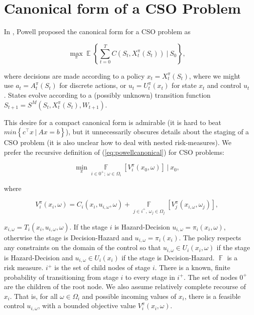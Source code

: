 \documentclass[final,1p,times]{elsarticle}
\DeclareMathOperator*{\E}{\mathbb{E}}
\DeclareMathOperator*{\F}{\mathbb{F}}
\begin{document}
\section{Canonical form of a CSO Problem}\label{sec:canonical}

In \cite{powell_tutORial}, Powell proposed the canonical form for a CSO problem as

\begin{equation}
    \max\limits_\pi \E \left\{\sum\limits_{t=0}^T C(S_t, X_t^\pi(S_t))\ |\ S_0 \right\},
    \label{eq:powellcanonical}
\end{equation}

where decisions are made according to a policy $x_t=X_t^\pi(S_t)$, where we might use $a_t =A_t^\pi(S_t)$ for discrete actions, or $u_t=U_t^\pi(x_t)$ for state $x_t$ and control $u_t$. States evolve according to a (possibly unknown) transition function $S_{t+1}=S^M(S_t,X_t^\pi(S_t),W_{t+1})$.

This desire for a compact canonical form is admirable (it is hard to beat $min\left\{c^\top x\ |\ Ax = b\right\}$), but it unnecessarily obscures details about the staging of a CSO problem (it is also unclear how to deal with nested risk-measures). We prefer the recursive definition of (\ref{eq:powellcanonical}) for CSO problems:

\begin{equation}
    \min\limits_\pi \F\limits_{i\in0^+;\ \omega \in \Omega_i}\left[V^\pi_i(x_0, \omega) \right]\ |\ x_0,
\end{equation}

where

\begin{equation}
  V^\pi_i(x_i, \omega) = C_i(x_i, u_{i,\omega}, \omega) + \F\limits_{j\in i^{+},\  \omega_j \in \Omega_j} \left[V^\pi_j(x_{i,\omega}, \omega_j)\right],
\end{equation}

$x_{i,\omega} = T_i(x_i, u_{i,\omega}, \omega)$. If the stage $i$ is Hazard-Decision $u_{i,\omega} = \pi_i(x_i, \omega)$, otherwise the stage is Decision-Hazard and $u_{i,\omega} = \pi_i(x_i)$. The policy respects any constraints on the domain of the control so that $u_{i,\omega} \in U_i(x_i, \omega)$ if the stage is Hazard-Decision and $u_{i,\omega} \in U_i(x_i)$ if the stage is Decision-Hazard. $\F$ is a risk measure. $i^+$ is the set of child nodes of stage $i$. There is a known, finite probability of transitioning from stage $i$ to every stage in $i^+$. The set of nodes $0^+$ are the children of the root node. We also assume relatively complete recourse of $x_i$. That is, for all $\omega \in \Omega_i$ and possible incoming values of $x_i$, there is a feasible control $u_{i,\omega}$, with a bounded objective value $V^\pi_i(x_i,\omega)$.
\end{document}
